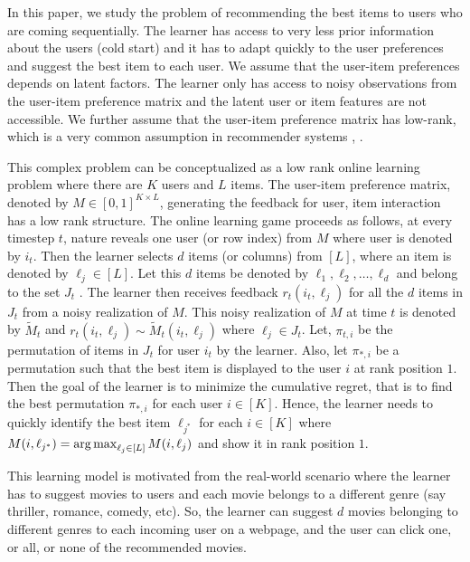 In this paper, we study the problem of recommending the best items to users who are coming sequentially. The learner has access to very less prior information about the users (cold start) and it has to adapt quickly to the user preferences and suggest the best item to each user. We assume that the user-item preferences depends on latent factors. The learner only has access to noisy observations from the user-item preference matrix and the latent user or item features are not accessible. We further assume that the user-item preference matrix has low-rank, which is a very common assumption in recommender systems \citep{koren2009matrix}, \citep{ricci2011liorrokach}. %

	This complex problem can be conceptualized as a low rank online learning  problem where there are $K$ users and $L$ items. The user-item preference  matrix, denoted by $M\in [0,1]^{K\times L}$,  generating the feedback for user, item interaction has a low rank structure. The online learning game proceeds as follows, at every timestep $t$,  nature reveals one user (or row index) from $M$ where user is denoted by $i_t$. Then the learner selects $d$ items (or columns) from $[L]$, where an item is denoted by $\ell _{j}\in [L]$. Let this $d$ items be denoted by $ \ell_{1}, \ell_2, \dots, \ell_d$ and belong to the set $J_t$ . The learner then receives feedback $r_{t}(i_t,\ell_{j})$ for all the $d$ items in $J_t$ from a noisy realization of $M$. This noisy realization of $M$ at time $t$ is denoted by $\tilde{M}_t$ and  $r_{t}(i_t,\ell_{j}) \sim \tilde{M}_t(i_t,\ell_{j})$ where $\ell_j \in J_t$. Let, $\pi_{t, i}$ be the permutation of items in $J_t$ for user $i_t$ by the learner. Also, let $\pi_{*, i}$ be a permutation such  that the best item is  displayed to the user $i$ at rank position $1$. Then the goal of the learner is to minimize the cumulative regret, that is to find the best permutation $\pi_{*, i}$ for each user $i\in[K]$. Hence, the learner needs to quickly identify the best item $\ell_{j^*}$ for each $i\in [K]$ where $M(i,\ell_{j^*}) = \mathop{\rm arg\,max} _{\ell_j\in[L]} M(i,\ell_j)$ and show it in rank position $1$. 
	

	This learning model is motivated from the real-world scenario where the learner has  to suggest movies to users and each movie belongs to a different genre (say thriller, romance, comedy, etc). So, the learner can suggest $d$ movies belonging to different genres to each incoming user on a webpage, and the user can click one, or all, or none of the recommended movies. 
	
%	
	
